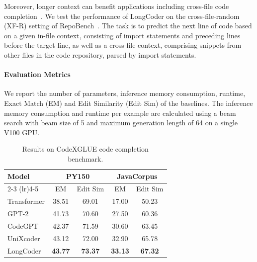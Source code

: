 \documentclass{article}
\begin{document}
Moreover, longer context can benefit applications including cross-file code completion~\citep{repobench}. We test the performance of LongCoder on the cross-file-random (XF-R) setting of RepoBench~\citep{repobench}. The task is to predict the next line of code based on a given in-file context, consisting of import statements and preceding lines before the target line, as well as a cross-file context, comprising snippets from other files in the code repository, parsed by import statements.

\paragraph{Evaluation Metrics} We report the number of parameters, inference memory consumption, runtime, Exact Match (EM) and Edit Similarity (Edit Sim) of the baselines. The inference memory consumption and runtime per example are calculated using a beam search with  beam size of 5 and maximum generation length of 64 on a single V100 GPU.

\begin{table}[t]
\caption{Results on CodeXGLUE code completion benchmark.}
\label{table:codexglue}
\begin{center}
\begin{small}
\begin{tabular}{lcccc}
    \toprule
    \multirow{2}{*}{Model} & \multicolumn{2}{c}{PY150} & \multicolumn{2}{c}{JavaCorpus} \\
    \cmidrule(lr){2-3} \cmidrule(lr){4-5}
    &EM &Edit Sim&EM &Edit Sim  \\
    \midrule
    Transformer & 38.51 & 69.01& 17.00 & 50.23\\
    GPT-2 &41.73 & 70.60&27.50 & 60.36\\
    CodeGPT & 42.37 & 71.59& 30.60 & 63.45\\
    UniXcoder& 43.12&72.00& 32.90&65.78\\
    \midrule
    LongCoder & \bf{43.77}&\bf{73.37}& \bf{33.13}&\bf{67.32}\\
    \bottomrule
\end{tabular}
\end{small}
\end{center}
\end{table}
\end{document}
